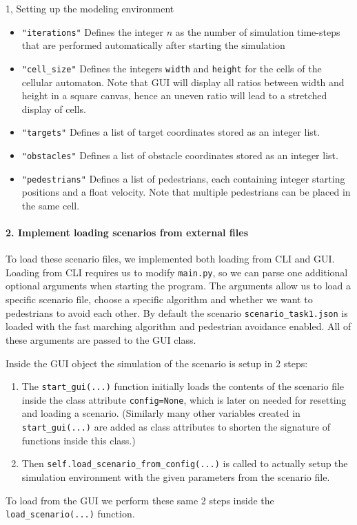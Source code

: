 \documentclass[10pt,a4paper]{article}
\begin{document}
\begin{task}{1, Setting up the modeling environment}
\newpage
\begin{itemize}
    \item \texttt{"iterations"} Defines the integer $n$ as the number of simulation time-steps that are performed automatically after starting the simulation
    \item \texttt{"cell\_size"} Defines the integers \texttt{width} and \texttt{height} for the cells of the cellular automaton. Note that GUI will display all ratios between width and height in a square canvas, hence an uneven ratio will lead to a stretched display of cells.
    \item \texttt{"targets"} Defines a list of target coordinates stored as an integer list.
    \item \texttt{"obstacles"} Defines a list of obstacle coordinates stored as an integer list.
    \item \texttt{"pedestrians"} Defines a list of pedestrians, each containing integer starting positions and a float velocity. Note that multiple pedestrians can be placed in the same cell.
\end{itemize}

\paragraph{2. Implement loading scenarios from external files}
To load these scenario files, we implemented both loading from CLI and GUI. Loading from CLI requires us to modify \texttt{main.py}, so we can parse one additional optional arguments when starting the program. The arguments allow us to load a specific scenario file, choose a specific algorithm and whether we want to pedestrians to avoid each other. By default the scenario \texttt{scenario\_task1.json} is loaded with the fast marching algorithm and pedestrian avoidance enabled. All of these arguments are passed to the GUI class.

Inside the GUI object the simulation of the scenario is setup in 2 steps:
\begin{enumerate}
    \item The \texttt{start\_gui(...)} function initially loads the contents of the scenario file inside the class attribute \texttt{config=None}, which is later on needed for resetting and loading a scenario. (Similarly many other variables created in \texttt{start\_gui(...)} are added as class attributes to shorten the signature of functions inside this class.)
    \item Then \texttt{self.load\_scenario\_from\_config(...)} is called to actually setup the simulation environment with the given parameters from the scenario file.
\end{enumerate}
To load from the GUI we perform these same 2 steps inside the \texttt{load\_scenario(...)} function.


\end{task}
\end{document}
